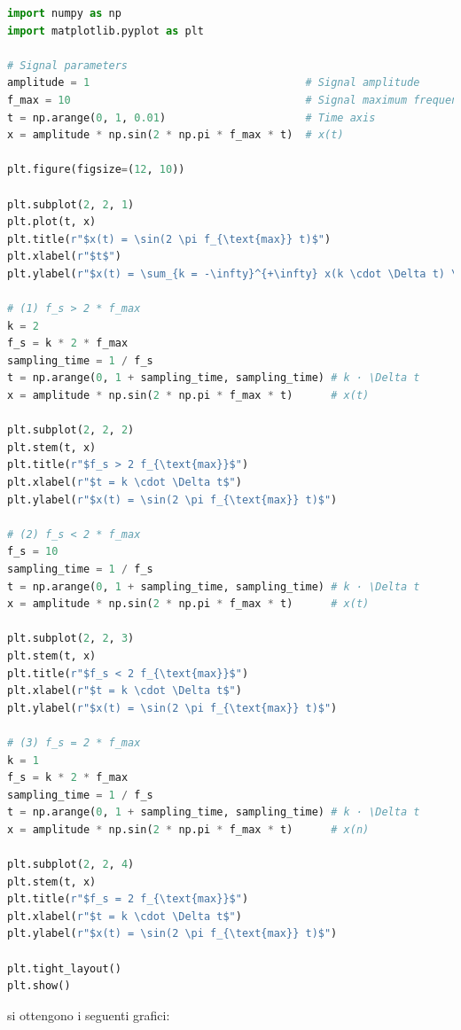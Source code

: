 \documentclass[a4paper,12pt]{report}  %
\begin{document}
\begin{lstlisting}[language=Python,keywords={import, as, arange, sin, pi, figure, subplot, plot, title, xlabel, ylabel, stem, tight_layout, show}]
import numpy as np
import matplotlib.pyplot as plt

# Signal parameters
amplitude = 1                                  # Signal amplitude
f_max = 10                                     # Signal maximum frequency
t = np.arange(0, 1, 0.01)                      # Time axis
x = amplitude * np.sin(2 * np.pi * f_max * t)  # x(t)

plt.figure(figsize=(12, 10))

plt.subplot(2, 2, 1)
plt.plot(t, x)
plt.title(r"$x(t) = \sin(2 \pi f_{\text{max}} t)$")
plt.xlabel(r"$t$")
plt.ylabel(r"$x(t) = \sum_{k = -\infty}^{+\infty} x(k \cdot \Delta t) \cdot sinc \left ( \frac{t}{\Delta t} - k \right )$")

# (1) f_s > 2 * f_max
k = 2
f_s = k * 2 * f_max
sampling_time = 1 / f_s
t = np.arange(0, 1 + sampling_time, sampling_time) # k · \Delta t
x = amplitude * np.sin(2 * np.pi * f_max * t)      # x(t)

plt.subplot(2, 2, 2)
plt.stem(t, x)
plt.title(r"$f_s > 2 f_{\text{max}}$")
plt.xlabel(r"$t = k \cdot \Delta t$")
plt.ylabel(r"$x(t) = \sin(2 \pi f_{\text{max}} t)$")

# (2) f_s < 2 * f_max
f_s = 10
sampling_time = 1 / f_s
t = np.arange(0, 1 + sampling_time, sampling_time) # k · \Delta t
x = amplitude * np.sin(2 * np.pi * f_max * t)      # x(t)

plt.subplot(2, 2, 3)
plt.stem(t, x)
plt.title(r"$f_s < 2 f_{\text{max}}$")
plt.xlabel(r"$t = k \cdot \Delta t$")
plt.ylabel(r"$x(t) = \sin(2 \pi f_{\text{max}} t)$")

# (3) f_s = 2 * f_max
k = 1
f_s = k * 2 * f_max
sampling_time = 1 / f_s
t = np.arange(0, 1 + sampling_time, sampling_time) # k · \Delta t
x = amplitude * np.sin(2 * np.pi * f_max * t)      # x(n)

plt.subplot(2, 2, 4)
plt.stem(t, x)
plt.title(r"$f_s = 2 f_{\text{max}}$")
plt.xlabel(r"$t = k \cdot \Delta t$")
plt.ylabel(r"$x(t) = \sin(2 \pi f_{\text{max}} t)$")

plt.tight_layout()
plt.show()
\end{lstlisting}

si ottengono i seguenti grafici:
\end{document}
